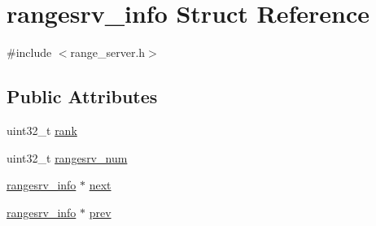 \hypertarget{structrangesrv__info}{\section{rangesrv\-\_\-info Struct Reference}
\label{structrangesrv__info}
}


{\ttfamily \#include $<$range\-\_\-server.\-h$>$}

\subsection*{Public Attributes}
\begin{DoxyCompactItemize}
\item 
uint32\-\_\-t \hyperlink{structrangesrv__info_af545372bc5a40a38b84408a208866960}{rank}
\item 
uint32\-\_\-t \hyperlink{structrangesrv__info_a90a6558f7f1922ae3394838255a937f3}{rangesrv\-\_\-num}
\item 
\hyperlink{structrangesrv__info}{rangesrv\-\_\-info} $\ast$ \hyperlink{structrangesrv__info_a7f87ab56d045e24e315b354075208b6d}{next}
\item 
\hyperlink{structrangesrv__info}{rangesrv\-\_\-info} $\ast$ \hyperlink{structrangesrv__info_af0a671859e5383bf4bab7f7a53b49b3b}{prev}
\end{DoxyCompactItemize}


